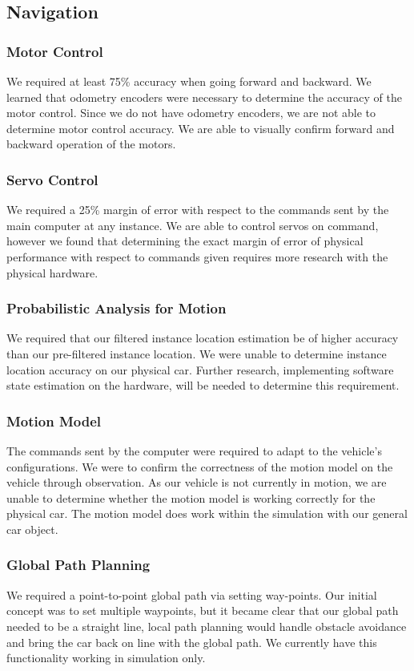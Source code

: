 \documentclass[compsoc,draftclsnofoot,onecolumn,10pt]{IEEEtran}
\begin{document}
\subsection{Navigation}
\subsubsection{Motor Control}
We required at least 75\% accuracy when going forward and backward. We learned that odometry encoders were necessary to determine the accuracy of the motor control. Since we do not have odometry encoders, we are not able to determine motor control accuracy. We are able to visually confirm forward and backward operation of the motors.

\subsubsection{Servo Control}
We required a 25\% margin of error with respect to the commands sent by the main computer at any instance. We are able to control servos on command, however we found that determining the exact margin of error of physical performance with respect to commands given requires more research with the physical hardware.


\subsubsection{Probabilistic Analysis for Motion}
We required that our filtered instance location estimation be of higher accuracy than our pre-filtered instance location. We were unable to determine instance location accuracy on our physical car. Further research, implementing software state estimation on the hardware, will be needed to determine this requirement.


\subsubsection{Motion Model}
The commands sent by the computer were required to adapt to the vehicle's configurations. We were to confirm the correctness of the motion model on the vehicle through observation. As our vehicle is not currently in motion, we are unable to determine whether the motion model is working correctly for the physical car. The motion model does work within the simulation with our general car object.

\subsubsection{Global Path Planning}
We required a point-to-point global path via setting way-points. Our initial concept was to set multiple waypoints, but it became clear that our global path needed to be a straight line, local path planning would handle obstacle avoidance and bring the car back on line with the global path.  We currently have this functionality working in simulation only.
\end{document}
